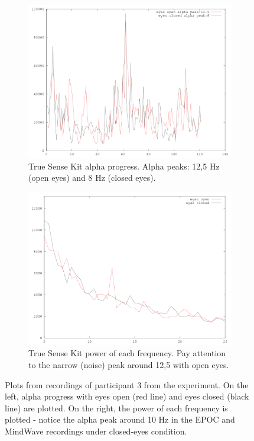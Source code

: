 \documentclass[a4paper,10pt,english,lof,lot,twoside]{puthesis}
\begin{document}
\begin{figure}
\begin{subfigure}[t]{0.49\linewidth}
\includegraphics[width=1.000\linewidth]{experiment-final-7-truesense-alpha-progress.png}
\caption[True Sense Kit alpha progress.]{True Sense Kit alpha progress. Alpha peaks: 12,5 Hz (open eyes) and 8 Hz (closed eyes).}\label{ch-experiment/index:fig-experiment-final-7-truesense-alpha-progress}\end{subfigure}
\begin{subfigure}[t]{0.49\linewidth}
\centering
\capstart

\includegraphics[width=1.000\linewidth]{experiment-final-7-truesense-pwelch-power.png}
\caption[True Sense Kit power of each frequency.]{True Sense Kit power of each frequency. Pay attention to the narrow (noise) peak around 12,5 with open eyes.}\label{ch-experiment/index:fig-experiment-final-7-truesense-alpha-power}\end{subfigure}
\caption[Experiment recording 7]{Plots from recordings of participant 3 from the experiment. On the left, alpha progress
with eyes open (red line) and eyes closed (black line) are plotted. On the right,
the power of each
frequency is plotted - notice the alpha peak around 10 Hz in the EPOC and MindWave
recordings under closed-eyes condition.}\label{ch-experiment/index:fig-final-experiment-recording-7}

\end{figure}
\end{document}
